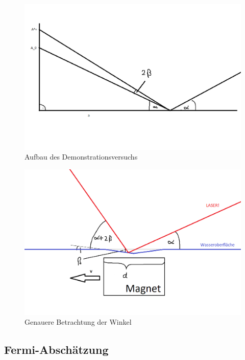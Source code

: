 \documentclass[11pt,a4paper,titlepage, ngerman]{article}
\begin{document}
		\begin{figure}
			\includegraphics[width=\textwidth]{SkizzeFermi1.png}
			\caption{Aufbau des Demonstrationsversuchs}
			\label{fig:Fermi1}
		\end{figure}
		\begin{figure}
			\includegraphics[width=\textwidth]{SkizzeFermi2.png}
			\caption{Genauere Betrachtung der Winkel}
			\label{fig:Fermi2}
		\end{figure}
				
		\subsection*{Fermi-Abschätzung}
				
\end{document}

